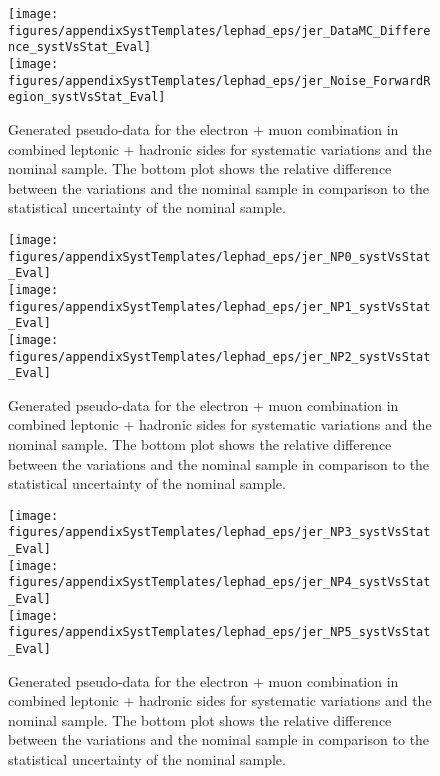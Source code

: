 \begin{figure}[!hb]
\begin{center}
        \texttt{[image: figures/appendixSystTemplates/lephad\_eps/jer\_DataMC\_Difference\_systVsStat\_Eval]}\\
        \texttt{[image: figures/appendixSystTemplates/lephad\_eps/jer\_Noise\_ForwardRegion\_systVsStat\_Eval]}\\
\caption{Generated pseudo-data for the electron + muon combination in combined leptonic + hadronic sides for systematic variations and the nominal \ttbar sample. The bottom plot shows the relative difference between the variations and the nominal sample in comparison to the statistical uncertainty of the nominal sample.}   
\label{fig:systematicVar_lephad_JER_1_1}
\end{center}
\end{figure}

\begin{figure}[!hb]
\begin{center}
        \texttt{[image: figures/appendixSystTemplates/lephad\_eps/jer\_NP0\_systVsStat\_Eval]}\\
        \texttt{[image: figures/appendixSystTemplates/lephad\_eps/jer\_NP1\_systVsStat\_Eval]}\\
        \texttt{[image: figures/appendixSystTemplates/lephad\_eps/jer\_NP2\_systVsStat\_Eval]}\\
\caption{Generated pseudo-data for the electron + muon combination in combined leptonic + hadronic sides for systematic variations and the nominal \ttbar sample. The bottom plot shows the relative difference between the variations and the nominal sample in comparison to the statistical uncertainty of the nominal sample.}   
\label{fig:systematicVar_lephad_JER_1_2}
\end{center}
\end{figure}

\begin{figure}[!hb]
\begin{center}
        \texttt{[image: figures/appendixSystTemplates/lephad\_eps/jer\_NP3\_systVsStat\_Eval]}\\
        \texttt{[image: figures/appendixSystTemplates/lephad\_eps/jer\_NP4\_systVsStat\_Eval]}\\
        \texttt{[image: figures/appendixSystTemplates/lephad\_eps/jer\_NP5\_systVsStat\_Eval]}\\
\caption{Generated pseudo-data for the electron + muon combination in combined leptonic + hadronic sides for systematic variations and the nominal \ttbar sample. The bottom plot shows the relative difference between the variations and the nominal sample in comparison to the statistical uncertainty of the nominal sample.}   
\label{fig:systematicVar_lephad_JER_1_3}
\end{center}
\end{figure}

